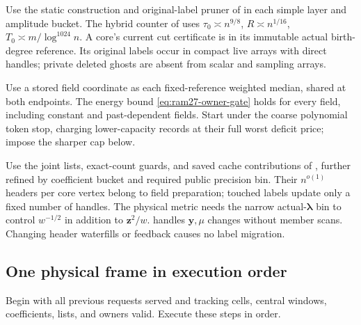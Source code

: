 \documentclass[11pt]{article}
\theoremstyle{remark}
\newcommand{\llambda}{\boldsymbol{\lambda}}
\newcommand{\yy}{\mathbf y}
\newcommand{\zz}{\mathbf z}
\begin{document}
Use the static construction and original-label pruner of
 in each simple layer and amplitude bucket.
The hybrid counter of  uses $\tau_0\asymp n^{9/8}$,
$R\asymp n^{1/16}$, $T_0\asymp m/\log^{1024} n$.
A core's current cut certificate is in its immutable actual birth-degree
reference.
Its original labels occur in compact live arrays with direct handles; private
deleted ghosts are absent from scalar and sampling arrays.

Use a stored field coordinate as each fixed-reference weighted median, shared at
both endpoints.
The energy bound \eqref{eq:ram27-owner-gate} holds for every field, including
constant and past-dependent fields.
Start under the coarse polynomial token stop, charging lower-capacity records at
their full worst deficit price; impose the sharper cap below.

Use the joint lists, exact-count guards, and saved cache contributions of
, further refined by coefficient bucket and
required public precision bin.
Their $n^{o(1)}$ headers per core vertex belong to field preparation; touched
labels update only a fixed number of handles.
The physical metric needs the narrow actual-$\llambda$ bin to control $w^{-1/2}$
in addition to $\zz^2/w$.
 handles $\yy,\mu$ changes without member scans.
Changing header waterfills or feedback causes no label migration.

\subsection{One physical frame in execution order}
\label{sec:ram30-frame-order}

Begin with all previous requests served and tracking cells, central windows,
coefficients, lists, and owners valid.
Execute these steps in order.
\end{document}
